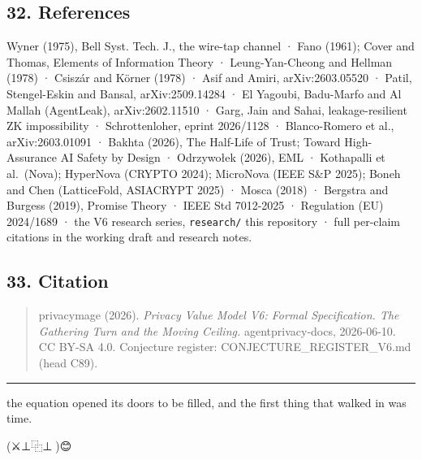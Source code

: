 \documentclass[
]{article}
\begin{document}
\subsection{32. References}\label{references}

Wyner (1975), Bell Syst. Tech. J., the wire-tap channel · Fano (1961);
Cover and Thomas, Elements of Information Theory · Leung-Yan-Cheong and
Hellman (1978) · Csiszár and Körner (1978) · Asif and Amiri,
arXiv:2603.05520 · Patil, Stengel-Eskin and Bansal, arXiv:2509.14284 ·
El Yagoubi, Badu-Marfo and Al Mallah (AgentLeak), arXiv:2602.11510 ·
Garg, Jain and Sahai, leakage-resilient ZK impossibility ·
Schrottenloher, eprint 2026/1128 · Blanco-Romero et al.,
arXiv:2603.01091 · Bakhta (2026), The Half-Life of Trust; Toward
High-Assurance AI Safety by Design · Odrzywołek (2026), EML · Kothapalli
et al.~(Nova); HyperNova (CRYPTO 2024); MicroNova (IEEE S\&P 2025);
Boneh and Chen (LatticeFold, ASIACRYPT 2025) · Mosca (2018) · Bergstra
and Burgess (2019), Promise Theory · IEEE Std 7012-2025 · Regulation
(EU) 2024/1689 · the V6 research series, \texttt{research/} this
repository · full per-claim citations in the working draft and research
notes.

\subsection{33. Citation}\label{citation}

\begin{quote}
privacymage (2026). \emph{Privacy Value Model V6: Formal Specification.
The Gathering Turn and the Moving Ceiling.} agentprivacy-docs,
2026-06-10. CC BY-SA 4.0. Conjecture register:
CONJECTURE\_REGISTER\_V6.md (head C89).
\end{quote}

\begin{center}\rule{0.5\linewidth}{0.5pt}\end{center}

the equation opened its doors to be filled, and the first thing that
walked in was time.

(⚔️⊥⿻⊥🧙)😊
\end{document}
